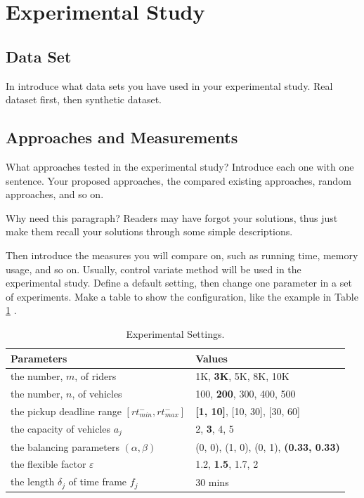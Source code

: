 \section{Experimental Study}
\label{sec:experimental}

\subsection{Data Set}
In introduce what data sets you have used in your experimental study. Real dataset first, then synthetic dataset.

\subsection{Approaches and Measurements}
What approaches tested in the experimental study? Introduce each one with one sentence. Your proposed approaches, the compared existing approaches, random approaches, and so on. 

Why need this paragraph? Readers may have forgot your solutions, thus just make them recall your solutions through some simple descriptions.

Then introduce the measures you will compare on, such as running time, memory usage, and so on. Usually, control variate method will be used in the experimental study. Define a default setting, then change one parameter in a set of experiments. Make a table to show the configuration, like the example in Table \ref{tab:settings} \cite{cheng2017utility}.

\begin{table}[t]
	\begin{center}
		{\small\scriptsize %
			\caption{\small Experimental Settings.} \label{tab:settings}
			\begin{tabular}{l|l}
				{\bf \qquad \qquad \quad Parameters} & {\bf \qquad \qquad \qquad Values} \\ \hline \hline
				the number, $m$, of riders  & 1K,  \textbf{3K}, 5K, 8K, 10K\\
				the number, $n$, of vehicles  & 100, \textbf{200}, 300, 400, 500 \\
				the pickup deadline range $[rt^-_{min}, rt^-_{max}]$  & \textbf{[1, 10]}, [10, 30], [30, 60]\\
				the capacity of vehicles $a_j$ & 2, \textbf{3}, 4, 5\\
				the balancing parameters $(\alpha, \beta)$& (0, 0), (1, 0), (0, 1), \textbf{(0.33, 0.33)}\\
				the flexible factor $\varepsilon$ & 1.2, \textbf{1.5}, 1.7, 2\\
				the length $\delta_j$ of time frame $f_j$ & 30 mins\\
				\hline
			\end{tabular}
		}\vspace{-2ex}
	\end{center}
\end{table}


